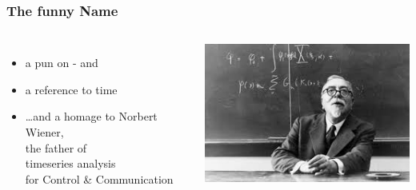 \documentclass{beamer}
\begin{document}
\begin{frame}
\frametitle{The funny Name}
\begin{columns}[T]
\begin{itemize}
\item a pun on - and 
\item a reference to time
\item \dots and a homage to Norbert Wiener,\\
      the father of \\ timeseries analysis \\
      for Control \& Communication
\end{itemize}
\includegraphics[width=\linewidth]{wiener.jpeg}
\end{columns}
\end{frame}
\end{document}
